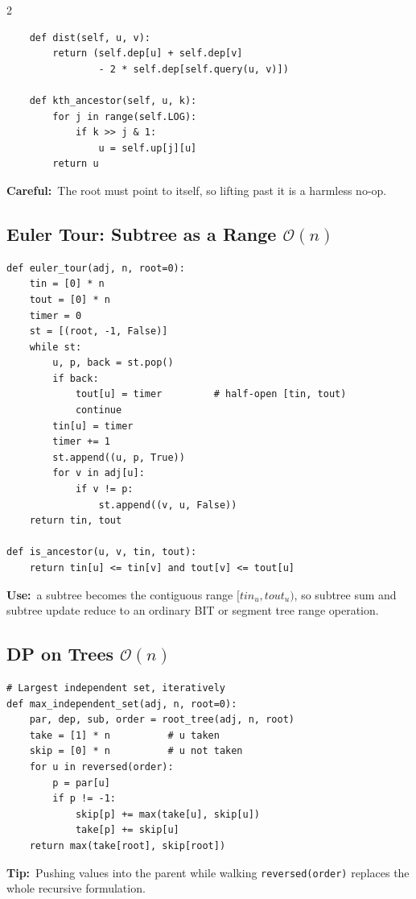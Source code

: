 \documentclass[10pt]{article}
\newcommand{\code}[1]{\texttt{\small #1}}
\newcommand{\sub}[2]{\subsection[#1]{#1\hspace{0.6em}%
  \textnormal{\color{accent2}\small$\mathcal{O}(#2)$}}}
\newcommand{\uses}[1]{{\color{accent2}\footnotesize\textbf{Use:}}~{\footnotesize #1}\par}
\newcommand{\tip}[1]{{\color{tipc}\footnotesize\textbf{Tip:}}~{\footnotesize #1}\par}
\newcommand{\warn}[1]{{\color{warnc}\footnotesize\textbf{Careful:}}~{\footnotesize #1}\par}
\begin{document}
\begin{multicols}{2}
\begin{lstlisting}
    def dist(self, u, v):
        return (self.dep[u] + self.dep[v]
                - 2 * self.dep[self.query(u, v)])

    def kth_ancestor(self, u, k):
        for j in range(self.LOG):
            if k >> j & 1:
                u = self.up[j][u]
        return u
\end{lstlisting}
\warn{The root must point to itself, so lifting past it is a harmless
no-op.}

\sub{Euler Tour: Subtree as a Range}{n}
\begin{lstlisting}
def euler_tour(adj, n, root=0):
    tin = [0] * n
    tout = [0] * n
    timer = 0
    st = [(root, -1, False)]
    while st:
        u, p, back = st.pop()
        if back:
            tout[u] = timer         # half-open [tin, tout)
            continue
        tin[u] = timer
        timer += 1
        st.append((u, p, True))
        for v in adj[u]:
            if v != p:
                st.append((v, u, False))
    return tin, tout

def is_ancestor(u, v, tin, tout):
    return tin[u] <= tin[v] and tout[v] <= tout[u]
\end{lstlisting}
\uses{a subtree becomes the contiguous range $[tin_u, tout_u)$, so
subtree sum and subtree update reduce to an ordinary BIT or segment tree
range operation.}

\sub{DP on Trees}{n}
\begin{lstlisting}
# Largest independent set, iteratively
def max_independent_set(adj, n, root=0):
    par, dep, sub, order = root_tree(adj, n, root)
    take = [1] * n          # u taken
    skip = [0] * n          # u not taken
    for u in reversed(order):
        p = par[u]
        if p != -1:
            skip[p] += max(take[u], skip[u])
            take[p] += skip[u]
    return max(take[root], skip[root])
\end{lstlisting}
\tip{Pushing values into the parent while walking
\code{reversed(order)} replaces the whole recursive formulation.}


\end{multicols}
\end{document}
